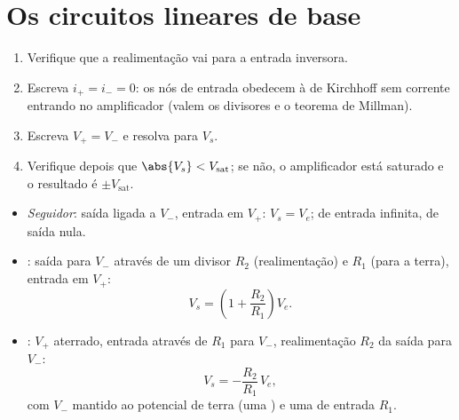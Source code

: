 \section{Os circuitos lineares de base}

\begin{method}\label{met:b1:operational-amplifier:method}
\begin{enumerate}
  \item Verifique que a realimentação vai para a entrada inversora.
  \item Escreva $i_+ = i_- = 0$: os nós de entrada obedecem à 
        de Kirchhoff sem corrente entrando no amplificador (valem os divisores e
        o teorema de Millman).
  \item Escreva $V_+ = V_-$ e resolva para $V_s$.
  \item Verifique depois que $\abs{V_s} < V_{\mathrm{sat}}$; se não,
        o amplificador está saturado e o resultado é $\pm V_{\mathrm{sat}}$.
\end{enumerate}
\end{method}

\begin{proposition}\label{prop:b1:operational-amplifier:basic}
\begin{itemize}
  \item \emph{Seguidor}: saída ligada a $V_-$, entrada em $V_+$:
        $V_s = V_e$;  de entrada infinita,  de saída nula.
  \item \emph{}: saída para $V_-$ através de um
        divisor $R_2$ (realimentação) e $R_1$ (para a terra), entrada em $V_+$:
        \[
        V_s = \left(1 + \frac{R_2}{R_1}\right)V_e .
        \]
  \item \emph{}: $V_+$ aterrado, entrada através de
        $R_1$ para $V_-$, realimentação $R_2$ da saída para $V_-$:
        \[
        V_s = -\frac{R_2}{R_1}\,V_e ,
        \]
        com $V_-$ mantido ao potencial de terra (uma \emph{})
        e uma  de entrada $R_1$.
\end{itemize}
\end{proposition}

